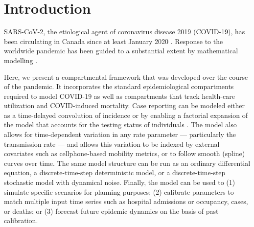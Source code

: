 \documentclass[12pt]{article}\usepackage[]{graphicx}\usepackage[]{color}
\begin{document}


\section{Introduction}

SARS-CoV-2, the etiological agent of coronavirus disease 2019 (COVID-19), has been circulating in Canada since at least January 2020 \cite{onpr_200125}.
Response to the worldwide pandemic \cite{Li+20,Fauc+20} has been guided to a substantial extent by mathematical modelling \cite{Flax+20}.


Here, we present a compartmental framework that was developed over the course of the pandemic. 
It incorporates the standard epidemiological compartments required to model COVID-19 as well as compartments that track health-care utilization and COVID-induced
mortality. 
Case reporting can be modeled either as a time-delayed convolution of incidence or by enabling a factorial expansion of the model that accounts for the testing status of individuals \cite{Fris+20}. 
The model also allows for time-dependent variation in any rate parameter --- particularly the transmission rate --- and allows this variation to be indexed by external covariates such as cellphone-based mobility metrics, or to follow smooth (spline) curves over time. 
The same model structure can be run as an ordinary differential equation, a discrete-time-step deterministic model, or a discrete-time-step stochastic model with dynamical noise.
Finally, the model can be used to
(1) simulate specific scenarios for planning purposes;
(2) calibrate parameters to match multiple input time series such as hospital admissions or occupancy, cases, or deaths; or
(3) forecast future epidemic dynamics on the basis of past calibration.
\end{document}
